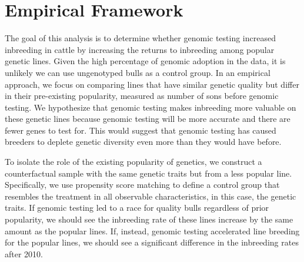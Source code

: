 \documentclass[12pt,letterpaper]{article}
\begin{document}




\section{Empirical Framework\label{sec:emp_frame}}
The goal of this analysis is to determine whether genomic testing increased inbreeding in cattle by increasing the returns to inbreeding among popular genetic lines. Given the high percentage of genomic adoption in the data, it is unlikely we can use ungenotyped bulls as a control group.
In an empirical approach, we focus on comparing lines that have similar genetic quality but differ in their pre-existing popularity, measured as number of sons before genomic testing. We hypothesize that genomic testing makes inbreeding more valuable on these genetic lines because genomic testing will be more accurate and there are fewer genes to test for.
This would suggest that genomic testing has caused breeders to deplete genetic diversity even more than they would have before.

To isolate the role of the existing popularity of genetics, we construct a counterfactual sample with the same genetic traits but from a less popular line.
Specifically, we use propensity score matching \citep{Smith2005} to define a control group that resembles the treatment in all observable characteristics, in this case, the genetic traits. 
If genomic testing led to a race for quality bulls regardless of prior popularity, we should see the inbreeding rate of these lines increase by the same amount as the popular lines.
If, instead, genomic testing accelerated line breeding for the popular lines, we should see a significant difference in the inbreeding rates after 2010.
\end{document}
